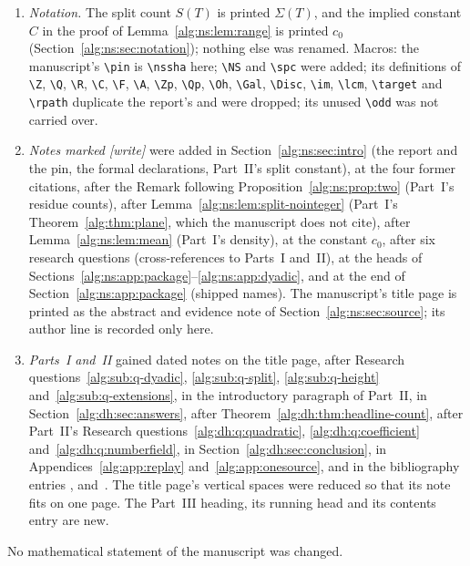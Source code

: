 \documentclass[11pt]{article}
\numberwithin{equation}{section}
\theoremstyle{plain}
\theoremstyle{plain}
\theoremstyle{plain}
\theoremstyle{definition}
\theoremstyle{definition}
\theoremstyle{definition}
\theoremstyle{remark}
\newcommand{\Z}{\mathbb Z}\newcommand{\Q}{\mathbb Q}
\newcommand{\R}{\mathbb R}\newcommand{\C}{\mathbb C}
\newcommand{\F}{\mathbb F}\newcommand{\A}{\mathbb A}\newcommand{\PP}{\mathbb P}
\newcommand{\Zp}{\Z_p}\newcommand{\Ztwo}{\Z_2}
\newcommand{\Qp}{\Q_p}\newcommand{\Oh}{\mathcal O}
\newcommand{\Gal}{\operatorname{Gal}}\newcommand{\im}{\operatorname{im}}
\newcommand{\target}{\boldsymbol b}
\newcommand{\wtag}{\textup{[write]}}%
\newcommand{\rpath}[1]{\nolinkurl{#1}}
\newcommand{\nssha}{\nolinkurl{6d04e1e385f2fe7d1cfbdbd8fd8d4e45bd6b6c72}}
\newcommand{\NS}{\mathrm{ns}}\newcommand{\spc}{\mathrm{sp}}
\begin{document}
\begin{enumerate}[label=(\arabic*)]
\cite{dh:proveitformal}. Its entries for Gao and Milne were merged into
Part~I's entries \cite{gao} and \cite{milne}, with their notes kept.
\item \emph{Notation.} The split count $S(T)$ is printed $\Sigma(T)$,
and the implied constant $C$ in the proof of
Lemma~\ref{alg:ns:lem:range} is printed $c_0$
(Section~\ref{alg:ns:sec:notation}); nothing else was renamed. Macros: the
manuscript's \verb|\pin| is \verb|\nssha| here; \verb|\NS| and
\verb|\spc| were added; its definitions of \verb|\Z|, \verb|\Q|,
\verb|\R|, \verb|\C|, \verb|\F|, \verb|\A|, \verb|\Zp|, \verb|\Qp|,
\verb|\Oh|, \verb|\Gal|, \verb|\Disc|, \verb|\im|, \verb|\lcm|,
\verb|\target| and \verb|\rpath| duplicate the report's and were dropped;
its unused \verb|\odd| was not carried over.
\item \emph{Notes marked \wtag} were added in
Section~\ref{alg:ns:sec:intro} (the report and the pin, the formal
declarations, Part~II's split constant), at the four former citations,
after the Remark following Proposition~\ref{alg:ns:prop:two} (Part~I's
residue counts), after Lemma~\ref{alg:ns:lem:split-nointeger} (Part~I's
Theorem~\ref{alg:thm:plane}, which the manuscript does not cite), after
Lemma~\ref{alg:ns:lem:mean} (Part~I's density), at the constant $c_0$,
after six research questions (cross-references to Parts~I and~II), at
the heads of Sections~\ref{alg:ns:app:package}--\ref{alg:ns:app:dyadic},
and at the end of Section~\ref{alg:ns:app:package} (shipped names). The
manuscript's title page is printed as the abstract and evidence note of
Section~\ref{alg:ns:sec:source}; its author line is recorded only here.
\item \emph{Parts~I and~II} gained dated notes on the title page, after
Research questions~\ref{alg:sub:q-dyadic}, \ref{alg:sub:q-split},
\ref{alg:sub:q-height} and~\ref{alg:sub:q-extensions}, in the
introductory paragraph of Part~II, in
Section~\ref{alg:dh:sec:answers}, after
Theorem~\ref{alg:dh:thm:headline-count}, after Part~II's Research
questions~\ref{alg:dh:q:quadratic}, \ref{alg:dh:q:coefficient}
and~\ref{alg:dh:q:numberfield}, in Section~\ref{alg:dh:sec:conclusion},
in Appendices~\ref{alg:app:replay} and~\ref{alg:app:onesource}, and in
the bibliography entries \cite{gao}, \cite{milne}
and~\cite{dh:proveitformal}. The title page's vertical spaces were
reduced so that its note fits on one page. The Part~III heading, its
running head and its contents entry are new.
\end{enumerate}
No mathematical statement of the manuscript was changed.
\end{document}
